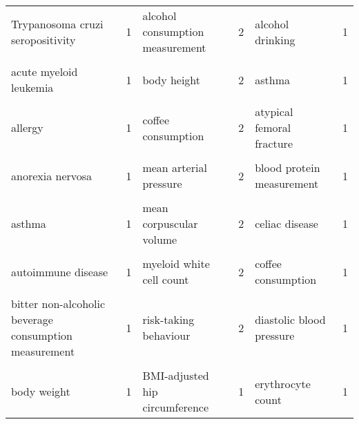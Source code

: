 \begin{landscape}
\begin{table}[hp]
{\begin{tabular}[t]{lrlrlr}
Trypanosoma cruzi seropositivity & 1 & alcohol consumption measurement & 2 & alcohol drinking & 1\\
\cellcolor{gray!6}{Vitiligo} & \cellcolor{gray!6}{1} & \cellcolor{gray!6}{alcohol drinking} & \cellcolor{gray!6}{2} & \cellcolor{gray!6}{allergen exposure measurement} & \cellcolor{gray!6}{1}\\
acute myeloid leukemia & 1 & body height & 2 & asthma & 1\\
\cellcolor{gray!6}{albumin:globulin ratio measurement} & \cellcolor{gray!6}{1} & \cellcolor{gray!6}{breast carcinoma} & \cellcolor{gray!6}{2} & \cellcolor{gray!6}{atrial fibrillation} & \cellcolor{gray!6}{1}\\
allergy & 1 & coffee consumption & 2 & atypical femoral fracture & 1\\
\cellcolor{gray!6}{ankylosing spondylitis} & \cellcolor{gray!6}{1} & \cellcolor{gray!6}{hypertension} & \cellcolor{gray!6}{2} & \cellcolor{gray!6}{basal cell carcinoma} & \cellcolor{gray!6}{1}\\
anorexia nervosa & 1 & mean arterial pressure & 2 & blood protein measurement & 1\\
\cellcolor{gray!6}{arterial stiffness measurement} & \cellcolor{gray!6}{1} & \cellcolor{gray!6}{mean corpuscular hemoglobin concentration} & \cellcolor{gray!6}{2} & \cellcolor{gray!6}{body height} & \cellcolor{gray!6}{1}\\
asthma & 1 & mean corpuscular volume & 2 & celiac disease & 1\\
\cellcolor{gray!6}{atopic asthma} & \cellcolor{gray!6}{1} & \cellcolor{gray!6}{monocyte percentage of leukocytes} & \cellcolor{gray!6}{2} & \cellcolor{gray!6}{cocaine dependence} & \cellcolor{gray!6}{1}\\
autoimmune disease & 1 & myeloid white cell count & 2 & coffee consumption & 1\\
\cellcolor{gray!6}{autoimmune thyroid disease} & \cellcolor{gray!6}{1} & \cellcolor{gray!6}{response to antineoplastic agent} & \cellcolor{gray!6}{2} & \cellcolor{gray!6}{corneal topography} & \cellcolor{gray!6}{1}\\
bitter non-alcoholic beverage consumption measurement & 1 & risk-taking behaviour & 2 & diastolic blood pressure & 1\\
\cellcolor{gray!6}{body height} & \cellcolor{gray!6}{1} & \cellcolor{gray!6}{systemic lupus erythematosus} & \cellcolor{gray!6}{2} & \cellcolor{gray!6}{electrocardiography} & \cellcolor{gray!6}{1}\\
body weight & 1 & BMI-adjusted hip circumference & 1 & erythrocyte count & 1\\

\end{tabular}}
\end{table}
\end{landscape}
